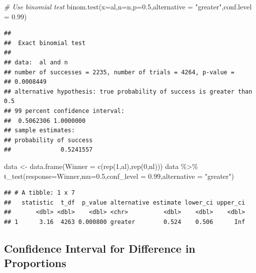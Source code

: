 \documentclass[
  11pt,
]{book}
\newenvironment{Shaded}{\begin{snugshade}}{\end{snugshade}}
\newcommand{\AttributeTok}[1]{\textcolor[rgb]{0.77,0.63,0.00}{#1}}
\newcommand{\CommentTok}[1]{\textcolor[rgb]{0.56,0.35,0.01}{\textit{#1}}}
\newcommand{\DecValTok}[1]{\textcolor[rgb]{0.00,0.00,0.81}{#1}}
\newcommand{\FloatTok}[1]{\textcolor[rgb]{0.00,0.00,0.81}{#1}}
\newcommand{\FunctionTok}[1]{\textcolor[rgb]{0.00,0.00,0.00}{#1}}
\newcommand{\NormalTok}[1]{#1}
\newcommand{\OtherTok}[1]{\textcolor[rgb]{0.56,0.35,0.01}{#1}}
\newcommand{\SpecialCharTok}[1]{\textcolor[rgb]{0.00,0.00,0.00}{#1}}
\newcommand{\StringTok}[1]{\textcolor[rgb]{0.31,0.60,0.02}{#1}}
\theoremstyle{definition}
\theoremstyle{definition}
\theoremstyle{definition}
\theoremstyle{definition}
\theoremstyle{remark}
\begin{document}
\begin{Shaded}
\begin{Highlighting}[]
\CommentTok{\# Use binomial test}
\FunctionTok{binom.test}\NormalTok{(}\AttributeTok{x=}\NormalTok{al,}\AttributeTok{n=}\NormalTok{n,}\AttributeTok{p=}\FloatTok{0.5}\NormalTok{,}\AttributeTok{alternative =} \StringTok{"greater"}\NormalTok{,}\AttributeTok{conf.level =} \FloatTok{0.99}\NormalTok{)}
\end{Highlighting}
\end{Shaded}

\begin{verbatim}
## 
##  Exact binomial test
## 
## data:  al and n
## number of successes = 2235, number of trials = 4264, p-value =
## 0.0008449
## alternative hypothesis: true probability of success is greater than 0.5
## 99 percent confidence interval:
##  0.5062306 1.0000000
## sample estimates:
## probability of success 
##              0.5241557
\end{verbatim}

\begin{Shaded}
\begin{Highlighting}[]
\NormalTok{data }\OtherTok{\textless{}{-}} \FunctionTok{data.frame}\NormalTok{(}\AttributeTok{Winner =} \FunctionTok{c}\NormalTok{(}\FunctionTok{rep}\NormalTok{(}\DecValTok{1}\NormalTok{,al),}\FunctionTok{rep}\NormalTok{(}\DecValTok{0}\NormalTok{,nl)))}
\NormalTok{data }\SpecialCharTok{\%\textgreater{}\%} \FunctionTok{t\_test}\NormalTok{(}\AttributeTok{response=}\NormalTok{Winner,}\AttributeTok{mu=}\FloatTok{0.5}\NormalTok{,}\AttributeTok{conf\_level =} \FloatTok{0.99}\NormalTok{,}\AttributeTok{alternative =} \StringTok{"greater"}\NormalTok{)}
\end{Highlighting}
\end{Shaded}

\begin{verbatim}
## # A tibble: 1 x 7
##   statistic  t_df  p_value alternative estimate lower_ci upper_ci
##       <dbl> <dbl>    <dbl> <chr>          <dbl>    <dbl>    <dbl>
## 1      3.16  4263 0.000800 greater        0.524    0.506      Inf
\end{verbatim}

\newpage

\hypertarget{confidence-interval-for-difference-in-proportions}{%
\subsection{Confidence Interval for Difference in Proportions}\label{confidence-interval-for-difference-in-proportions}}
\end{document}

